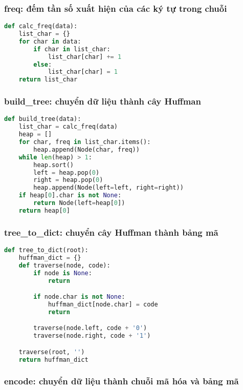     \subsubsection{freq: đếm tần số xuất hiện của các ký tự trong chuỗi}

\begin{lstlisting}[language=Python]
def calc_freq(data):
    list_char = {}
    for char in data:
        if char in list_char:
            list_char[char] += 1
        else:
            list_char[char] = 1
    return list_char
\end{lstlisting}

\subsubsection{build\_tree: chuyển dữ liệu thành cây Huffman}

\begin{lstlisting}[language=Python]
def build_tree(data):
    list_char = calc_freq(data)
    heap = []
    for char, freq in list_char.items():
        heap.append(Node(char, freq))
    while len(heap) > 1:
        heap.sort()
        left = heap.pop(0)
        right = heap.pop(0)
        heap.append(Node(left=left, right=right))
    if heap[0].char is not None:
        return Node(left=heap[0])
    return heap[0]
\end{lstlisting}

\subsubsection{tree\_to\_dict: chuyển cây Huffman thành bảng mã}

\begin{lstlisting}[language=Python]
def tree_to_dict(root):
    huffman_dict = {}
    def traverse(node, code):
        if node is None:
            return

        if node.char is not None:
            huffman_dict[node.char] = code
            return

        traverse(node.left, code + '0')
        traverse(node.right, code + '1')

    traverse(root, '')
    return huffman_dict
\end{lstlisting}

\subsubsection{encode: chuyển dữ liệu thành chuỗi mã hóa và bảng mã}

